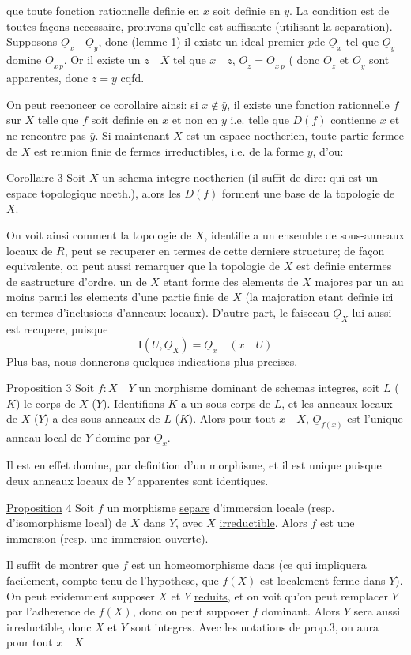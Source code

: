 que toute fonction rationnelle definie en $x$ soit definie en $y$.  La condition est de toutes façons necessaire, prouvons qu'elle est suffisante (utilisant la separation). Supposons $\underline O_x\quad\underline O_y$, donc (lemme 1) il existe un ideal premier $p$de $\underline O_x$ tel que $\underline O_y$ domine $\underline O_{x\,p}$. Or il existe un $z\quad X$ tel que $x\quad\bar z$, $\underline O_z=\underline O_{x\,p}$ (
donc $\underline O_z$ et $\underline O_y$ sont apparentes, donc $z=y$ cqfd.

On peut reenoncer ce corollaire ainsi: si $x\notin\bar y$, il existe une fonction rationnelle $f$ sur $X$ telle que $f$ soit definie en $x$ et non en $y$ i.e. telle que $D(f)$ contienne $x$ et ne rencontre pas $\bar y$. Si maintenant $X$ est un espace noetherien, toute partie fermee de $X$ est reunion finie de fermes irreductibles, i.e. de la forme $\bar y$, d'ou:

\uline{Corollaire} 3 Soit $X$ un schema integre noetherien (il suffit de dire: qui est un espace topologique noeth.), alors les $D(f)$ forment une base de la topologie de $X$.

On voit ainsi comment la topologie de $X$, identifie a un ensemble de sous-anneaux locaux de $R$, peut se recuperer en termes de cette derniere structure; de façon equivalente, on peut aussi remarquer que la topologie de $X$ est definie entermes de sastructure d'ordre, un  de $X$ etant forme des elements de $X$ majores par un au moins parmi les elements d'une partie finie de $X$ (la majoration etant definie  ici en termes d'inclusions  d'anneaux locaux). D'autre part, le faisceau $\underline O_X$ lui aussi est recupere, puisque
\[
\mathrm I(U,\underline O_X)=\underline O_x\quad(x\quad U)
\]
Plus bas, nous donnerons quelques indications plus precises.

\uline{Proposition} 3 Soit $f:X\quad Y$ un morphisme dominant de schemas integres,  soit $L$ ($K$) le corps de $X$ ($Y$). Identifions $K$ a un sous-corps de $L$, et les anneaux locaux de $X$ ($Y$) a des sous-anneaux de $L$ ($K$). Alors pour tout $x\quad X$, $\underline O_{f(x)}$ est l'unique anneau local de $Y$ domine par $\underline O_x$.

Il est en effet domine, par definition d'un morphisme, et il est unique puisque deux anneaux locaux de $Y$ apparentes sont identiques.

\uline{Proposition} 4 Soit $f$ un morphisme \uline{separe} d'immersion locale (resp. d'isomorphisme local) de $X$ dans $Y$, avec  $X$ \uline{irreductible}. Alors $f$ est une immersion (resp. une immersion ouverte).

Il suffit de montrer que $f$ est un homeomorphisme dans (ce qui impliquera facilement, compte tenu de l'hypothese, que $f(X)$ est localement ferme dans $Y$). On peut evidemment supposer $X$ et $Y$ \uline{reduits}, et on voit qu'on peut remplacer $Y$ par l'adherence de $f(X)$, donc on peut supposer $f$ dominant. Alors  $Y$ sera aussi irreductible, donc $X$ et $Y$ sont integres. Avec les notations de prop.3, on aura pour tout $x\quad X$
